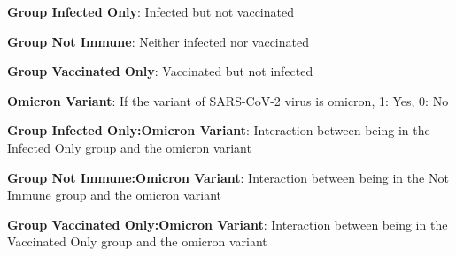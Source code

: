 \documentclass[11pt]{article}
\begin{document}
\begin{codeoutput}
\begin{table}[h]
\begin{threeparttable}
\begin{tablenotes}
\item \textbf{Group Infected Only}: Infected but not vaccinated
\item \textbf{Group Not Immune}: Neither infected nor vaccinated
\item \textbf{Group Vaccinated Only}: Vaccinated but not infected
\item \textbf{Omicron Variant}: If the variant of SARS-CoV-2 virus is omicron, 1: Yes, 0: No
\item \textbf{Group Infected Only:Omicron Variant}: Interaction between being in the Infected Only group and the omicron variant
\item \textbf{Group Not Immune:Omicron Variant}: Interaction between being in the Not Immune group and the omicron variant
\item \textbf{Group Vaccinated Only:Omicron Variant}: Interaction between being in the Vaccinated Only group and the omicron variant
\end{tablenotes}
\end{threeparttable}
\end{table}
\end{codeoutput}
\end{document}
